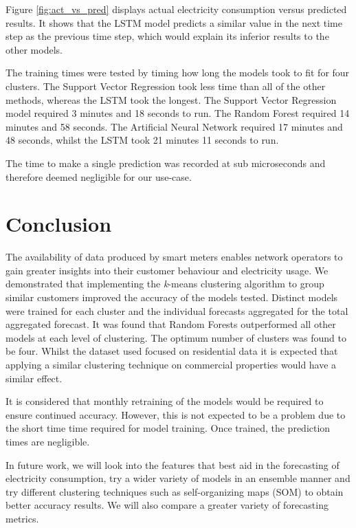Figure \ref{fig:act_vs_pred} displays actual electricity consumption versus predicted results. It shows that the LSTM model predicts a similar value in the next time step as the previous time step, which would explain its inferior results to the other models.  

The training times were tested by timing how long the models took to fit for four clusters. The Support Vector Regression took less time than all of the other methods, whereas the LSTM took the longest. The Support Vector Regression model required 3 minutes and 18 seconds to run. The Random Forest required 14 minutes and 58 seconds. The Artificial Neural Network required 17 minutes and 48 seconds, whilst the LSTM took 21 minutes 11 seconds to run.

The time to make a single prediction was recorded at sub microseconds and therefore deemed negligible for our use-case.

\section{Conclusion}

The availability of data produced by smart meters enables network operators to gain greater insights into their customer behaviour and electricity usage. We demonstrated that implementing the \textit{k}-means clustering algorithm to group similar customers improved the accuracy of the models tested. Distinct models were trained for each cluster and the individual forecasts aggregated for the total aggregated forecast. It was found that Random Forests outperformed all other models at each level of clustering. The optimum number of clusters was found to be four. Whilst the dataset used focused on residential data it is expected that applying a similar clustering technique on commercial properties would have a similar effect.

It is considered that monthly retraining of the models would be required to ensure continued accuracy. However, this is not expected to be a problem due to the short time time required for model training. Once trained, the prediction times are negligible.

In future work, we will look into the features that best aid in the forecasting of electricity consumption, try a wider variety of models in an ensemble manner and try different clustering techniques such as self-organizing maps (SOM) to obtain better accuracy results. We will also compare a greater variety of forecasting metrics.

